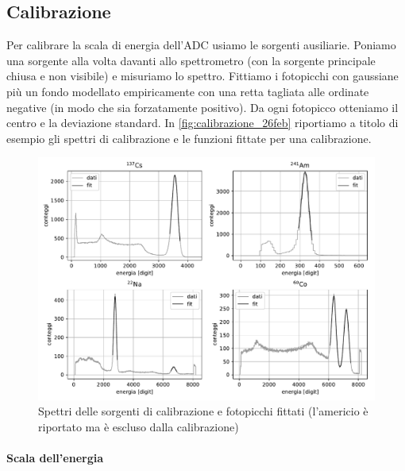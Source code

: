 \subsection{Calibrazione}\label{par:fondo1}

Per calibrare la scala di energia dell'ADC usiamo le sorgenti ausiliarie.
Poniamo una sorgente alla volta davanti allo spettrometro (con la sorgente principale chiusa e non visibile)
e misuriamo lo spettro.
Fittiamo i fotopicchi con gaussiane più un fondo modellato empiricamente con una retta tagliata alle ordinate negative
(in modo che sia forzatamente positivo).
Da ogni fotopicco otteniamo il centro e la deviazione standard.
In \autoref{fig:calibrazione_26feb} riportiamo a titolo di esempio gli spettri di calibrazione e le funzioni fittate per una calibrazione.

\begin{figure}
	\hspace{-2em}
	\includegraphics[width=40em]{calibrazione_26feb}
	\caption{\label{fig:calibrazione_26feb}
		Spettri delle sorgenti di calibrazione e fotopicchi fittati (l'americio è riportato ma è escluso dalla calibrazione)}
\end{figure}

\paragraph{Scala dell'energia}

